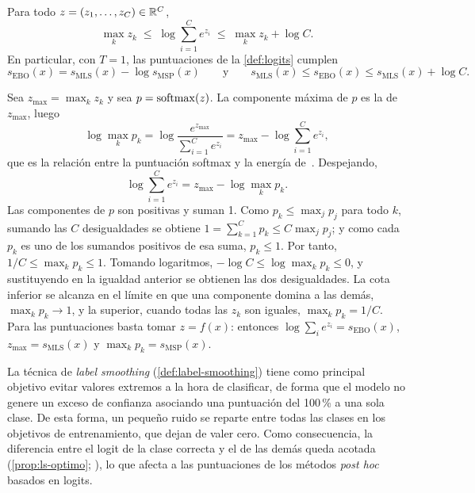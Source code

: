 \begin{proposicion}\label{prop:logsumexp}
Para todo $z = (z_1, \dots, z_C) \in \mathbb{R}^C$,
\[
  \max_{k} z_k \;\le\; \log \sum_{i=1}^{C} e^{z_i} \;\le\; \max_{k} z_k + \log C .
\]
En particular, con $T = 1$, las puntuaciones de la \cref{def:logits} cumplen
\[
  s_{\mathrm{EBO}}(x) = s_{\mathrm{MLS}}(x) - \log s_{\mathrm{MSP}}(x)
  \qquad \text{y} \qquad
  s_{\mathrm{MLS}}(x) \le s_{\mathrm{EBO}}(x) \le s_{\mathrm{MLS}}(x) + \log C .
\]
\end{proposicion}
\begin{demostracion}
Sea $z_{\max} = \max_k z_k$ y sea $p = \operatorname{softmax}(z)$. La componente máxima de $p$ es la de $z_{\max}$, luego
\[
  \log \max_k p_k = \log \frac{e^{z_{\max}}}{\sum_{i=1}^{C} e^{z_i}} = z_{\max} - \log \sum_{i=1}^{C} e^{z_i},
\]
que es la relación entre la puntuación softmax y la energía de~\cite[sec.~3.2]{liu2020energy}. Despejando,
\[
  \log \sum_{i=1}^{C} e^{z_i} = z_{\max} - \log \max_k p_k .
\]
Las componentes de $p$ son positivas y suman 1. Como $p_k \le \max_j p_j$ para todo $k$, sumando las $C$ desigualdades se obtiene $1 = \sum_{k=1}^{C} p_k \le C \max_j p_j$; y como cada $p_k$ es uno de los sumandos positivos de esa suma, $p_k \le 1$. Por tanto, $1/C \le \max_k p_k \le 1$. Tomando logaritmos, $-\log C \le \log \max_k p_k \le 0$, y sustituyendo en la igualdad anterior se obtienen las dos desigualdades. La cota inferior se alcanza en el límite en que una componente domina a las demás, $\max_k p_k \to 1$, y la superior, cuando todas las $z_k$ son iguales, $\max_k p_k = 1/C$. Para las puntuaciones basta tomar $z = f(x)$: entonces $\log \sum_i e^{z_i} = s_{\mathrm{EBO}}(x)$, $z_{\max} = s_{\mathrm{MLS}}(x)$ y $\max_k p_k = s_{\mathrm{MSP}}(x)$.
\end{demostracion}

\begin{observacion}\label{obs:ls-logits}
La técnica de \emph{label smoothing} (\cref{def:label-smoothing}) tiene como principal objetivo evitar valores extremos a la hora de clasificar, de forma que el modelo no genere un exceso de confianza asociando una puntuación del 100\,\% a una sola clase. De esta forma, un pequeño ruido se reparte entre todas las clases en los objetivos de entrenamiento, que dejan de valer cero. Como consecuencia, la diferencia entre el logit de la clase correcta y el de las demás queda acotada (\cref{prop:ls-optimo}; \cite[sec.~2]{muller2019}), lo que afecta a las puntuaciones de los métodos \emph{post hoc} basados en logits.
\end{observacion}

